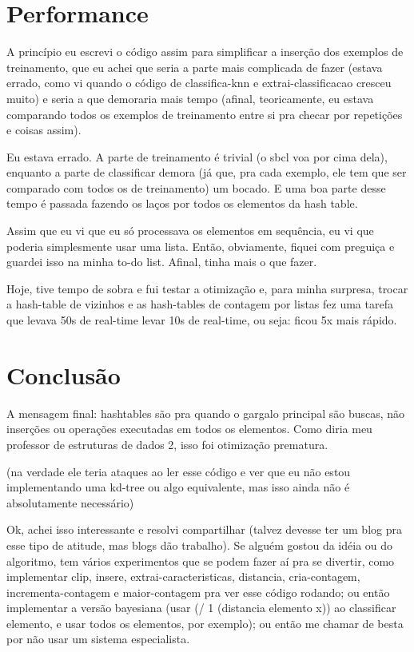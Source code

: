 \documentclass[12pt,brazil]{book}
\begin{document}
\section{Performance}
\label{sec:perf}

A princípio eu escrevi o código assim para simplificar a inserção dos
exemplos de treinamento, que eu achei que seria a parte mais
complicada de fazer (estava errado, como vi quando o código de
classifica-knn e extrai-classificacao cresceu muito) e seria a que
demoraria mais tempo (afinal, teoricamente, eu estava comparando todos
os exemplos de treinamento entre si pra checar por repetições e coisas
assim).

Eu estava errado. A parte de treinamento é trivial (o sbcl voa por
cima dela), enquanto a parte de classificar demora (já que, pra cada
exemplo, ele tem que ser comparado com todos os de treinamento) um
bocado. E uma boa parte desse tempo é passada fazendo os laços por
todos os elementos da hash table.

Assim que eu vi que eu só processava os elementos em sequência, eu vi
que poderia simplesmente usar uma lista. Então, obviamente, fiquei com
preguiça e guardei isso na minha to-do list. Afinal, tinha mais o que
fazer.

Hoje, tive tempo de sobra e fui testar a otimização e, para minha
surpresa, trocar a hash-table de vizinhos e as hash-tables de contagem
por listas fez uma tarefa que levava 50s de real-time levar 10s de
real-time, ou seja: ficou 5x mais rápido.

\section{Conclusão}
\label{sec:concl}

A mensagem final: hashtables são pra quando o gargalo principal são
buscas, não inserções ou operações executadas em todos os
elementos. Como diria meu professor de estruturas de dados 2, isso foi
otimização prematura.

(na verdade ele teria ataques ao ler esse código e ver que eu não
estou implementando uma kd-tree ou algo equivalente, mas isso ainda
não é absolutamente necessário)

Ok, achei isso interessante e resolvi compartilhar (talvez devesse ter
um blog pra esse tipo de atitude, mas blogs dão trabalho). Se alguém
gostou da idéia ou do algoritmo, tem vários experimentos que se podem
fazer aí pra se divertir, como implementar clip, insere,
extrai-caracteristicas, distancia, cria-contagem, incrementa-contagem
e maior-contagem pra ver esse código rodando; ou então implementar a
versão bayesiana (usar (/ 1 (distancia elemento x)) ao classificar
elemento, e usar todos os elementos, por exemplo); ou então me chamar
de besta por não usar um sistema especialista.
\end{document}
